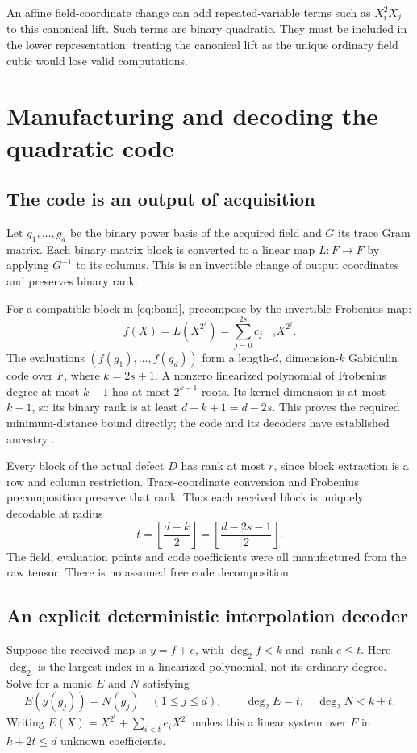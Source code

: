 \documentclass[11pt]{article}
\theoremstyle{remark}\newtheorem{remark}[theorem]{Remark}
\newcommand{\rank}{\operatorname{rank}}
\begin{document}
An affine field-coordinate change can add repeated-variable terms such as $X_i^2X_j$ to this canonical lift. Such terms are binary quadratic. They must be included in the lower representation: treating the canonical lift as the unique ordinary field cubic would lose valid computations.

\section{Manufacturing and decoding the quadratic code}
\subsection{The code is an output of acquisition}
Let $g_1,\ldots,g_d$ be the binary power basis of the acquired field and $G$ its trace Gram matrix. Each binary matrix block is converted to a linear map $L:F\to F$ by applying $G^{-1}$ to its columns. This is an invertible change of output coordinates and preserves binary rank.

For a compatible block in \eqref{eq:band}, precompose by the invertible Frobenius map:
\[
 f(X)=L(X^{2^s})=\sum_{j=0}^{2s}c_{j-s}X^{2^j}.
\]
The evaluations $(f(g_1),\ldots,f(g_d))$ form a length-$d$, dimension-$k$ Gabidulin code over $F$, where $k=2s+1$. A nonzero linearized polynomial of Frobenius degree at most $k-1$ has at most $2^{k-1}$ roots. Its kernel dimension is at most $k-1$, so its binary rank is at least $d-k+1=d-2s$. This proves the required minimum-distance bound directly; the code and its decoders have established ancestry \cite{silva,bombar}.

Every block of the actual defect $D$ has rank at most $r$, since block extraction is a row and column restriction. Trace-coordinate conversion and Frobenius precomposition preserve that rank. Thus each received block is uniquely decodable at radius
\[
 t=\left\lfloor\frac{d-k}{2}\right\rfloor
 =\left\lfloor\frac{d-2s-1}{2}\right\rfloor.
\]
The field, evaluation points and code coefficients were all manufactured from the raw tensor. There is no assumed free code decomposition.

\subsection{An explicit deterministic interpolation decoder}
Suppose the received map is $y=f+e$, with $\deg_2 f<k$ and $\rank e\le t$. Here $\deg_2$ is the largest index in a linearized polynomial, not its ordinary degree. Solve for a monic $E$ and $N$ satisfying
\begin{equation}\label{eq:decoder}
 E(y(g_j))=N(g_j)\quad(1\le j\le d),\qquad
 \deg_2 E=t,\quad \deg_2N<k+t.
\end{equation}
Writing $E(X)=X^{2^t}+\sum_{i<t}e_iX^{2^i}$ makes this a linear system over $F$ in $k+2t\le d$ unknown coefficients.
\end{document}
